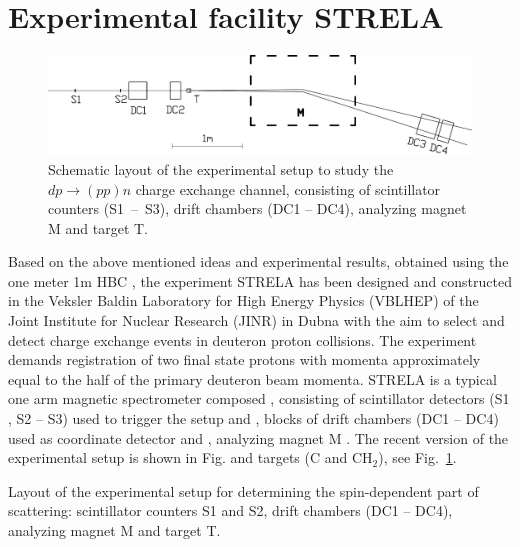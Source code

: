 \documentclass[twocolumn,epjc3]{svjour3}
\newcommand{\np}     {\ensuremath{np \rightarrow pn}\xspace}
\newcommand{\dpchex} {\ensuremath{dp \rightarrow (pp)n}\xspace}
\providecommand{\DIFaddtex}[1]{{\protect\color{Green} \sf #1}} %
\providecommand{\DIFdeltex}[1]{{\protect\color{Red} \scriptsize #1}} %
\providecommand{\DIFaddbegin}{} %
\providecommand{\DIFaddend}{} %
\providecommand{\DIFdelbegin}{} %
\providecommand{\DIFdelend}{} %
\providecommand{\DIFaddFL}[1]{\DIFadd{#1}} %
\providecommand{\DIFdelFL}[1]{\DIFdel{#1}} %
\providecommand{\DIFadd}[1]{\texorpdfstring{\DIFaddtex{#1}}{#1}} %
\providecommand{\DIFdel}[1]{\texorpdfstring{\DIFdeltex{#1}}{}} %
\newcommand{\DIFscaledelfig}{0.5}
\newlength{\DIFdelgraphicswidth} %
\newlength{\DIFdelgraphicsheight} %
\newcommand{\DIFaddincludegraphics}[2][]{{\color{blue}\fbox{\DIFOincludegraphics[#1]{#2}}}} %
\newcommand{\DIFdelincludegraphics}[2][]{%
\sbox{\DIFdelgraphicsbox}{\DIFOincludegraphics[#1]{#2}}%
\settoboxwidth{\DIFdelgraphicswidth}{\DIFdelgraphicsbox} %
\settoboxtotalheight{\DIFdelgraphicsheight}{\DIFdelgraphicsbox} %
\scalebox{\DIFscaledelfig}{%
\parbox[b]{\DIFdelgraphicswidth}{\usebox{\DIFdelgraphicsbox}\\[-\baselineskip] \rule{\DIFdelgraphicswidth}{0em}}\llap{\resizebox{\DIFdelgraphicswidth}{\DIFdelgraphicsheight}{%
\setlength{\unitlength}{\DIFdelgraphicswidth}%
\begin{picture}(1,1)%
\thicklines\linethickness{2pt} %
{\color[rgb]{1,0,0}\put(0,0){\framebox(1,1){}}}%
{\color[rgb]{1,0,0}\put(0,0){\line( 1,1){1}}}%
{\color[rgb]{1,0,0}\put(0,1){\line(1,-1){1}}}%
\end{picture}%
}\hspace*{3pt}}} %
} %
\DeclareRobustCommand{\DIFaddbegin}{\DIFOaddbegin \let\includegraphics\DIFaddincludegraphics} %
\DeclareRobustCommand{\DIFaddend}{\DIFOaddend \let\includegraphics\DIFOincludegraphics} %
\DeclareRobustCommand{\DIFdelbegin}{\DIFOdelbegin \let\includegraphics\DIFdelincludegraphics} %
\DeclareRobustCommand{\DIFdelend}{\DIFOaddend \let\includegraphics\DIFOincludegraphics} %
\begin{document}
\section{Experimental facility STRELA}
\DIFaddbegin 

\begin{figure}[t] %
  \centering
  \includegraphics[width=1.00\textwidth]{STRELA_layout.pdf}
  \caption{\DIFaddFL{Schematic layout of the experimental setup to study the }\dpchex
    \DIFaddFL{charge exchange channel, consisting of scintillator counters (S1~--~S3),
    drift chambers (DC1 -- DC4), analyzing magnet M and target T.}}
  \label{fig:STRELA_layout}
\end{figure}

\DIFaddend Based on the above mentioned ideas and experimental results, obtained using the
\DIFdelbegin \DIFdel{one meter }\DIFdelend \DIFaddbegin \DIFadd{1m }\DIFaddend HBC \cite{gla02,gla08}, the experiment STRELA has been designed and
constructed in the Veksler Baldin Laboratory for High Energy Physics (VBLHEP) of
the Joint Institute for Nuclear Research (JINR) in Dubna with the aim to select
and detect charge exchange events in deuteron proton collisions. The experiment
demands registration of two \DIFaddbegin \DIFadd{final state }\DIFaddend protons with momenta approximately equal
to the half of the primary deuteron beam momenta. STRELA is a typical one arm
magnetic spectrometer\DIFdelbegin \DIFdel{composed }\DIFdelend \DIFaddbegin \DIFadd{, consisting }\DIFaddend of scintillator detectors \DIFaddbegin \DIFadd{(}\DIFaddend S1 \DIFdelbegin \DIFdel{, S2 }\DIFdelend \DIFaddbegin \DIFadd{-- S3) }\DIFaddend used to
trigger the setup\DIFdelbegin \DIFdel{and }\DIFdelend \DIFaddbegin \DIFadd{, }\DIFaddend blocks of drift chambers (DC1 -- DC4) used as coordinate
detector\DIFdelbegin \DIFdel{and
}\DIFdelend \DIFaddbegin \DIFadd{, }\DIFaddend analyzing magnet M \DIFdelbegin \DIFdel{. The recent version of the experimental setup is shown in
Fig.}\DIFdelend \DIFaddbegin \DIFadd{and targets (C and CH$_2$), see
Fig.~}\DIFaddend \ref{fig:STRELA_layout}.

\DIFdelbegin %
{%
\DIFdelFL{Layout of the experimental setup for determining the spin-dependent
    part of }%
\DIFdelFL{scattering: scintillator counters S1 and S2, drift chambers (DC1
    -- DC4), analyzing magnet M and target T.}}
\end{document}
